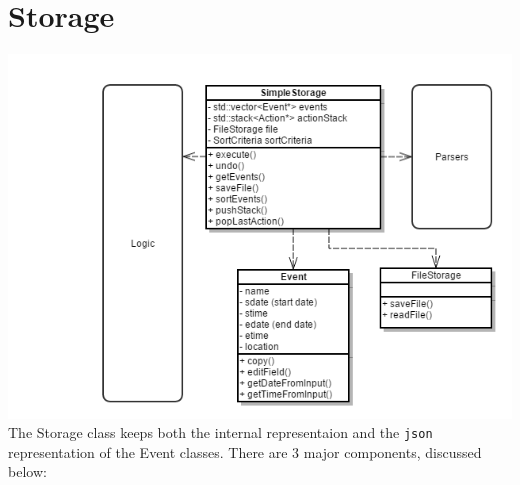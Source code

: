 \documentclass[12pt]{extarticle}
\begin{document}
\section{Storage}
\includegraphics[width=\textwidth]{storage_class_diagram}\\
The Storage class keeps both the internal representaion and the \texttt{json} representation of the Event classes. There are 3 major components, discussed below:
\end{document}
